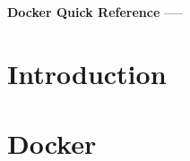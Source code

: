 \documentclass[a4paper, 11pt]{book}
\begin{document}
    \begin{titlepage}
        \centering
        \vspace*{2in}
        \Huge \textbf{Docker Quick Reference}
        \vfill
        \Large -----
        \vfill
    \end{titlepage}

    \tableofcontents
    
    \section{Introduction}
    
    \section{Docker}
\end{document}
